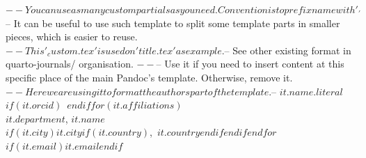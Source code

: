 $-- You can use as many custom partials as you need. Convention is to prefix name with '_'
$-- It can be useful to use such template to split some template parts in smaller pieces, which is easier to reuse.
$-- This '_custom.tex' is used on 'title.tex' as example.
$-- See other existing format in quarto-journals/ organisation.
$-- %
$-- Use it if you need to insert content at this specific place of the main Pandoc's template. Otherwise, remove it.
$-- Here we are using it to format the authors part of the template.
$-- %
\textbf{$it.name.literal$}$if(it.orcid)$~$endif$$for(it.affiliations)$\\\small $it.department$, \small $it.name$\\$if(it.city)$\small $it.city$$if(it.country)$,\ \small $it.country$$endif$$endif$$endfor$\\$if(it.email)$\small \href{mailto:$it.email$}{\texttt{$it.email$}}$endif$